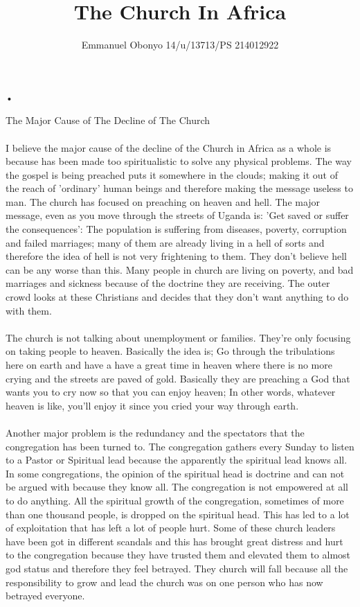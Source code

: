 \documentclass[10pt,a4paper]{report}
\author{Emmanuel Obonyo 14/u/13713/PS 214012922}
\title{The Church In Africa}
\begin{document}
•\maketitle The Major Cause of The Decline of The Church
 \\
 \\ I believe the major cause of the decline of the Church in Africa as a whole is because has been made too spiritualistic to solve any physical problems. The way the gospel is being preached puts it somewhere in the clouds; making it out of the reach of 'ordinary' human beings and therefore making the message useless to man. The church has focused on preaching on heaven and hell. The major message, even as you move through the streets of Uganda is: 'Get saved or suffer the consequences': The population is suffering from diseases, poverty, corruption and failed marriages; many of them are already living in a hell of sorts and therefore the idea of hell is not very frightening to them. They don't believe hell can be any worse than this. Many people in church are living on poverty, and bad marriages and sickness because of the doctrine they are receiving. The outer crowd looks at these Christians and decides that they don't want anything to do with them. 
\\
\\The church is not talking about unemployment or families. They're only focusing on taking people to heaven. Basically the idea is; Go through the tribulations here on earth and have a have a great time in heaven where there is no more crying and the streets are paved of gold. Basically they are preaching a God that wants you to cry now so that you can enjoy heaven; In other words, whatever heaven is like, you'll enjoy it since you cried your way through earth. 
\\
\\Another major problem is the redundancy and the spectators that the congregation has been turned to. The congregation gathers every Sunday to listen to a Pastor or Spiritual lead because the apparently the spiritual lead knows all. In some congregations, the opinion of the spiritual head is doctrine and can not be argued with because they know all. The congregation is not empowered at all to do anything. All the spiritual growth of the congregation, sometimes of more than one thousand people, is dropped on the spiritual head. This has led to a lot of exploitation that has left a lot of people hurt. Some of these church leaders have been got in different scandals and this has brought great distress and hurt to the congregation because they have trusted them and elevated them to almost god status and therefore they feel betrayed. They church will fall because all the  responsibility to grow and lead the church was on one person who has now betrayed everyone. 
\end{document}

